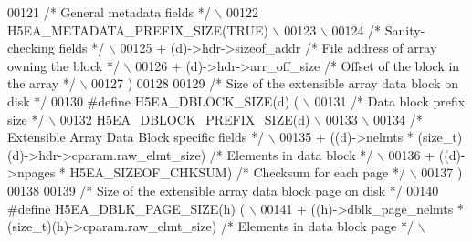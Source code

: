 \begin{DoxyCode}
00121 \textcolor{preprocessor}{    }\textcolor{comment}{/* General metadata fields */}\textcolor{preprocessor}{                                             \(\backslash\)}
00122 \textcolor{preprocessor}{    H5EA\_METADATA\_PREFIX\_SIZE(TRUE)                                           \(\backslash\)}
00123 \textcolor{preprocessor}{                                                                              \(\backslash\)}
00124 \textcolor{preprocessor}{    }\textcolor{comment}{/* Sanity-checking fields */}\textcolor{preprocessor}{                                              \(\backslash\)}
00125 \textcolor{preprocessor}{    + (d)->hdr->sizeof\_addr          }\textcolor{comment}{/* File address of array owning the block */}\textcolor{preprocessor}{ \(\backslash\)}
00126 \textcolor{preprocessor}{    + (d)->hdr->arr\_off\_size         }\textcolor{comment}{/* Offset of the block in the array */}\textcolor{preprocessor}{   \(\backslash\)}
00127 \textcolor{preprocessor}{    )}
00128 
00129 \textcolor{comment}{/* Size of the extensible array data block on disk */}
00130 \textcolor{preprocessor}{#define H5EA\_DBLOCK\_SIZE(d)     (                                             \(\backslash\)}
00131 \textcolor{preprocessor}{    }\textcolor{comment}{/* Data block prefix size  */}\textcolor{preprocessor}{                                             \(\backslash\)}
00132 \textcolor{preprocessor}{    H5EA\_DBLOCK\_PREFIX\_SIZE(d)                                                \(\backslash\)}
00133 \textcolor{preprocessor}{                                                                              \(\backslash\)}
00134 \textcolor{preprocessor}{    }\textcolor{comment}{/* Extensible Array Data Block specific fields */}\textcolor{preprocessor}{                         \(\backslash\)}
00135 \textcolor{preprocessor}{    + ((d)->nelmts * (size\_t)(d)->hdr->cparam.raw\_elmt\_size) }\textcolor{comment}{/* Elements in data block  */}\textcolor{preprocessor}{  \(\backslash\)}
00136 \textcolor{preprocessor}{    + ((d)->npages * H5EA\_SIZEOF\_CHKSUM)        }\textcolor{comment}{/* Checksum for each page */}\textcolor{preprocessor}{  \(\backslash\)}
00137 \textcolor{preprocessor}{    )}
00138 
00139 \textcolor{comment}{/* Size of the extensible array data block page on disk */}
00140 \textcolor{preprocessor}{#define H5EA\_DBLK\_PAGE\_SIZE(h)     (                          \(\backslash\)}
00141 \textcolor{preprocessor}{    + ((h)->dblk\_page\_nelmts * (size\_t)(h)->cparam.raw\_elmt\_size) }\textcolor{comment}{/* Elements in data block page */}\textcolor{preprocessor}{  \(\backslash\)}

\end{DoxyCode}
